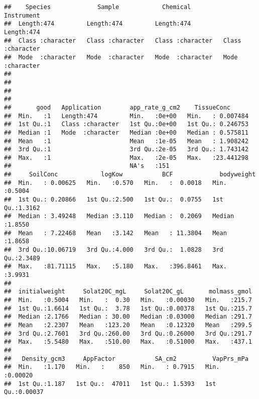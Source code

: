 \documentclass[
]{article}
\begin{document}
\begin{verbatim}
##    Species             Sample            Chemical          Instrument       
##  Length:474         Length:474         Length:474         Length:474        
##  Class :character   Class :character   Class :character   Class :character  
##  Mode  :character   Mode  :character   Mode  :character   Mode  :character  
##                                                                             
##                                                                             
##                                                                             
##                                                                             
##       good   Application        app_rate_g_cm2    TissueConc       
##  Min.   :1   Length:474         Min.   :0e+00   Min.   : 0.007484  
##  1st Qu.:1   Class :character   1st Qu.:0e+00   1st Qu.: 0.246753  
##  Median :1   Mode  :character   Median :0e+00   Median : 0.575811  
##  Mean   :1                      Mean   :1e-05   Mean   : 1.908242  
##  3rd Qu.:1                      3rd Qu.:2e-05   3rd Qu.: 1.743142  
##  Max.   :1                      Max.   :2e-05   Max.   :23.441298  
##                                 NA's   :151                        
##     SoilConc            logKow           BCF             bodyweight    
##  Min.   : 0.00625   Min.   :0.570   Min.   :  0.0018   Min.   :0.5004  
##  1st Qu.: 0.20866   1st Qu.:2.500   1st Qu.:  0.0755   1st Qu.:1.3162  
##  Median : 3.49248   Median :3.110   Median :  0.2069   Median :1.8550  
##  Mean   : 7.22468   Mean   :3.142   Mean   : 11.3804   Mean   :1.8658  
##  3rd Qu.:10.06719   3rd Qu.:4.000   3rd Qu.:  1.0828   3rd Qu.:2.3489  
##  Max.   :81.71115   Max.   :5.180   Max.   :396.8461   Max.   :3.9931  
##                                                                        
##  initialweight     Solat20C_mgL     Solat20C_gL       molmass_gmol  
##  Min.   :0.5004   Min.   :  0.30   Min.   :0.00030   Min.   :215.7  
##  1st Qu.:1.6614   1st Qu.:  3.78   1st Qu.:0.00378   1st Qu.:215.7  
##  Median :2.1766   Median : 30.00   Median :0.03000   Median :291.7  
##  Mean   :2.2307   Mean   :123.20   Mean   :0.12320   Mean   :299.5  
##  3rd Qu.:2.7601   3rd Qu.:260.00   3rd Qu.:0.26000   3rd Qu.:291.7  
##  Max.   :5.5480   Max.   :510.00   Max.   :0.51000   Max.   :437.1  
##                                                                     
##   Density_gcm3     AppFactor           SA_cm2          VapPrs_mPa     
##  Min.   :1.170   Min.   :    850   Min.   : 0.7915   Min.   :0.00020  
##  1st Qu.:1.187   1st Qu.:  47011   1st Qu.: 1.5393   1st Qu.:0.00037  

\end{verbatim}
\end{document}
